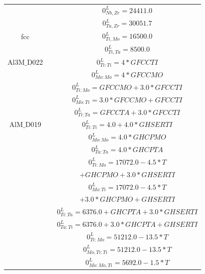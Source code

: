 \begin{longtable}[H]{ c c c }
                  & \cite{Guillermet1991} & $0^\textit{L}_{Nb,Zr} = 24411.0$\\
                  & \cite{Guillermet1995} & $0^\textit{L}_{Ta,Zr} = 30051.7$\\
           fcc & \cite{Ansara1998} & $0^\textit{L}_{Ti,Mo} = 16500.0$\\
                  & \cite{Ansara1998} & $0^\textit{L}_{Ti,Ta} = 8500.0$\\
    Al3M$\_$D022 & \cite{Ansara1998} & $0^\textit{L}_{Ti:Ti} = 4*GFCCTI$\\
                            & \cite{Ansara1998} & $0^\textit{L}_{Mo:Mo} = 4*GFCCMO$\\
                            & \cite{Ansara1998} & $0^\textit{L}_{Ti:Mo} = GFCCMO+3.0*GFCCTI$\\
                            & \cite{Ansara1998} & $0^\textit{L}_{Mo:Ti} = 3.0*GFCCMO+GFCCTI$\\
                            & \cite{Ansara1998} & $0^\textit{L}_{Ti:Ta} = GFCCTA+3.0*GFCCTI$\\
         AlM$\_$D019 & \cite{Ansara1998} & $0^\textit{L}_{Ti:Ti} = 4.0+4.0*GHSERTI$\\
                              & \cite{Ansara1998} & $0^\textit{L}_{Mo:Mo} = 4.0*GHCPMO$\\
                              & \cite{Ansara1998} & $0^\textit{L}_{Ta:Ta} = 4.0*GHCPTA$\\
                              & \cite{Ansara1998} & $0^\textit{L}_{Ti:Mo} = 17072.0-4.5*T$\\
                              &                             & $+GHCPMO+3.0*GHSERTI$\\
                              & \cite{Ansara1998} & $0^\textit{L}_{Mo:Ti} = 17072.0-4.5*T$\\
                              &                             & $+3.0*GHCPMO+GHSERTI$\\
                              & \cite{Ansara1998} & $0^\textit{L}_{Ti:Ta} = 6376.0+GHCPTA+3.0*GHSERTI$\\
                              & \cite{Ansara1998} & $0^\textit{L}_{Ta:Ti} = 6376.0+3.0*GHCPTA+GHSERTI$\\
                              & \cite{Ansara1998} & $0^\textit{L}_{Ti:Mo} = 51212.0-13.5*T$\\
                              & \cite{Ansara1998} & $0^\textit{L}_{Mo,Ti:Ti} = 51212.0-13.5*T$\\
                              & \cite{Ansara1998} & $0^\textit{L}_{Mo:Mo,Ti} = 5692.0-1.5*T$\\

\end{longtable}
